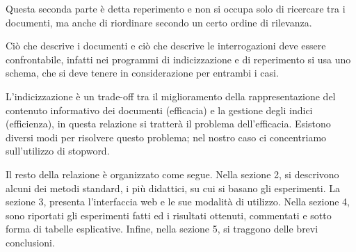 \documentclass[runningheads]{llncs}
\begin{document}
  Questa seconda parte \`e detta reperimento e non si occupa solo di ricercare tra i documenti, ma anche di riordinare secondo un certo ordine di rilevanza. 
  
  Ci\`o che descrive i documenti e ci\`o che descrive le interrogazioni deve essere confrontabile, infatti nei programmi di indicizzazione e di reperimento si usa uno schema, che si deve tenere in considerazione per entrambi i casi.
  
L'indicizzazione \`e un trade-off tra il  miglioramento della rappresentazione del
contenuto informativo dei documenti (efficacia) e la gestione degli indici (efficienza), in questa relazione si tratter\`a il problema dell'efficacia.
Esistono diversi modi per risolvere questo problema; nel nostro caso 
ci concentriamo sull'utilizzo di stopword.


Il resto della relazione \`e organizzato come segue. Nella sezione 2, si descrivono
alcuni dei metodi standard, i pi\`u didattici, su cui si basano gli esperimenti.
La sezione 3, presenta l'interfaccia web e le sue modalit\`a di utilizzo.
Nella sezione 4, sono riportati gli esperimenti fatti ed i risultati ottenuti,
commentati e sotto forma di tabelle esplicative. Infine, nella sezione 5,
si traggono delle brevi conclusioni.




% 
% 
\end{document}
